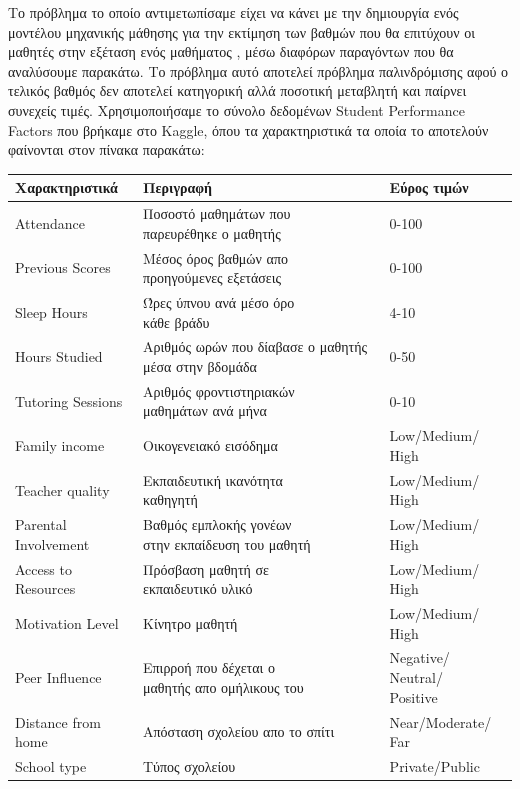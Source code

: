 \documentclass[12pt]{article}
\begin{document}
\noindent Το πρόβλημα το οποίο αντιμετωπίσαμε είχει να κάνει με την δημιουργία ενός μοντέλου μηχανικής μάθησης για την εκτίμηση των βαθμών που θα επιτύχουν οι μαθητές στην εξέταση ενός μαθήματος , μέσω διαφόρων παραγόντων που θα αναλύσουμε παρακάτω. Το πρόβλημα αυτό αποτελεί πρόβλημα παλινδρόμισης αφού ο τελικός βαθμός δεν αποτελεί κατηγορική αλλά ποσοτική μεταβλητή και παίρνει συνεχείς τιμές. Χρησιμοποιήσαμε το σύνολο δεδομένων  Student Performance Factors που βρήκαμε στο Kaggle, όπου τα χαρακτηριστικά τα οποία το αποτελούν φαίνονται στον πίνακα παρακάτω:\\

\begin{center}
\begin{longtable}{|p{5cm}|p{7.1cm}|p{4cm}|} %
\hline
Χαρακτηριστικά & Περιγραφή & Εύρος τιμών \\ %
\hline
Attendance & \makecell[l]{Ποσοστό μαθημάτων που\\ παρευρέθηκε ο μαθητής} & 0-100 \\ %
\hline
Previous Scores & \makecell[l]{Μέσος όρος βαθμών απο\\ προηγούμενες εξετάσεις} & 0-100 \\ %
\hline
Sleep Hours & \makecell[l]{Ώρες ύπνου ανά μέσο όρο\\ κάθε βράδυ} & 4-10 \\ %
\hline
Hours Studied & Αριθμός ωρών που δίαβασε ο μαθητής μέσα στην βδομάδα & 0-50 \\ %
\hline
Tutoring Sessions &\makecell[l]{Αριθμός φροντιστηριακών\\ μαθημάτων ανά μήνα} & 0-10 \\ %
\hline
Family income & Οικογενειακό εισόδημα & Low/Medium/ High \\ %
\hline
Teacher quality & \makecell[l]{Εκπαιδευτική ικανότητα\\ καθηγητή} & Low/Medium/ High \\ %
\hline
\makecell[l]{Parental\\ Involvement} & \makecell[l]{Βαθμός εμπλοκής γονέων\\ στην εκπαίδευση του μαθητή} & Low/Medium/ High \\ %
\hline
Access to Resources & \makecell[l]{Πρόσβαση μαθητή σε\\ εκπαιδευτικό υλικό} & Low/Medium/ High \\ %
\hline
Motivation Level & Κίνητρο μαθητή & Low/Medium/ High \\ %
\hline
Peer Influence & \makecell[l]{Επιρροή που δέχεται ο\\ μαθητής απο ομήλικους του} & \makecell[l]{Negative/\\ Neutral/ \\Positive} \\ %
\hline
Distance from home & Απόσταση σχολείου απο το σπίτι & Near/Moderate/ Far \\ %
\hline
School type & Τύπος σχολείου & Private/Public \\ %
\hline


\end{longtable}
\end{center}
\end{document}
